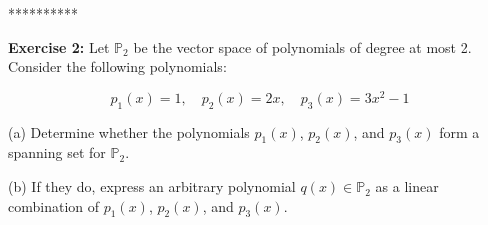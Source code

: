 \documentclass[]{article}
\begin{document}
	\centerline{**********}
	
	\textbf{Exercise 2:} Let $\mathbb{P}_2$ be the vector space of polynomials of degree at most 2. Consider the following polynomials:
	
	\[
	p_1(x) = 1, \quad p_2(x) = 2x, \quad p_3(x) = 3x^2 - 1
	\]
	
	(a) Determine whether the polynomials $p_1(x)$, $p_2(x)$, and $p_3(x)$ form a spanning set for $\mathbb{P}_2$.
	
	(b) If they do, express an arbitrary polynomial $q(x) \in \mathbb{P}_2$ as a linear combination of $p_1(x)$, $p_2(x)$, and $p_3(x)$.
	
\end{document}
